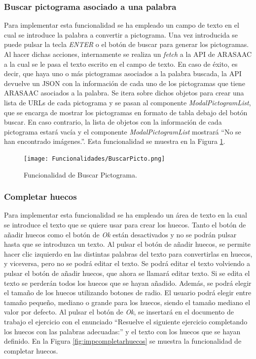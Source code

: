 \subsubsection{Buscar pictograma asociado a una palabra}
\label{sec:impbuscarpicto}
Para implementar esta funcionalidad se ha empleado un campo de texto en el cual se introduce la palabra a convertir a pictograma. Una vez introducida se puede pulsar la tecla \textit{ENTER} o el botón de buscar para generar los pictogramas. Al hacer dichas acciones, internamente se realiza un \textit{fetch} a la API de ARASAAC a la cual se le pasa el texto escrito en el campo de texto. En caso de éxito, es decir, que haya uno o más pictogramas asociados a la palabra buscada, la API devuelve un JSON con la información de cada uno de los pictogramas que tiene ARASAAC asociados a la palabra. Se itera sobre dichos objetos para crear una lista de URLs de cada pictograma y se pasan al componente \textit{ModalPictogramList}, que se encarga de mostrar los pictogramas en formato de tabla debajo del botón buscar. En caso contrario, la lista de objetos con la información de cada pictograma estará vacía y el componente \textit{ModalPictogramList} mostrará ``No se han encontrado imágenes.''. Esta funcionalidad se muestra en la Figura \ref{fig:buscarPictograma}.

\begin{figure}[ht!]
  \centering
  \texttt{[image: Funcionalidades/BuscarPicto.png]}
  \caption{Funcionalidad de Buscar Pictograma.}
  \label{fig:buscarPictograma}
\end{figure}

\subsubsection{Completar huecos}
\label{sec:impcompletarhuecos}
Para implementar esta funcionalidad se ha empleado un área de texto en la cual se introduce el texto que se quiere usar para crear los huecos. Tanto el botón de añadir huecos como el botón de \textit{Ok} están desactivados y no se podrán pulsar hasta que se introduzca un texto. Al pulsar el botón de añadir huecos, se permite hacer clic izquierdo en las distintas palabras del texto para convertirlas en huecos, y viceversa, pero no se podrá editar el texto. Se podrá editar el texto volviendo a pulsar el botón de añadir huecos, que ahora se llamará editar texto. Si se edita el texto se perderán todos los huecos que se hayan añadido. Además, se podrá elegir el tamaño de los huecos utilizando botones de radio. El usuario podrá elegir entre tamaño pequeño, mediano o grande para los huecos, siendo el tamaño mediano el valor por defecto. Al pulsar el botón de \textit{Ok}, se insertará en el documento de trabajo el ejercicio con el enunciado ``Resuelve el siguiente ejercicio completando los huecos con las palabras adecuadas:'' y el texto con los huecos que se hayan definido. En la Figura \ref{fig:impcompletarhuecos} se muestra la funcionalidad de completar huecos.

